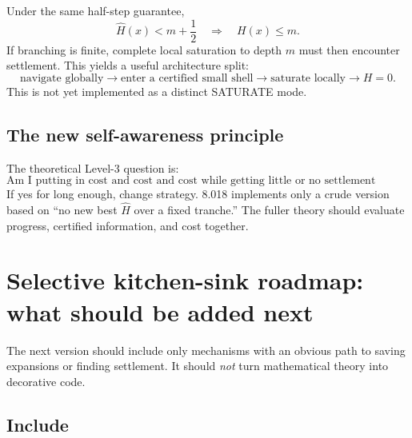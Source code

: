 \documentclass[11pt]{article}
\begin{document}
Under the same half-step guarantee,
\[
\widehat H(x)<m+\frac12\quad\Rightarrow\quad H(x)\le m.
\]
If branching is finite, complete local saturation to depth $m$ must then encounter settlement. This yields a useful architecture split:
\[
\boxed{\text{navigate globally} \to \text{enter a certified small shell} \to \text{saturate locally} \to H=0.}
\]
This is not yet implemented as a distinct SATURATE mode.

\subsection{The new self-awareness principle}

The theoretical Level-3 question is:
\[
\boxed{\text{Am I putting in cost and cost and cost while getting little or no settlement benefit?}}
\]
If yes for long enough, change strategy. 8.018 implements only a crude version based on ``no new best $\widehat H$ over a fixed tranche.'' The fuller theory should evaluate progress, certified information, and cost together.

\section{Selective kitchen-sink roadmap: what should be added next}

The next version should include only mechanisms with an obvious path to saving expansions or finding settlement. It should \emph{not} turn mathematical theory into decorative code.

\subsection{Include}
\end{document}
